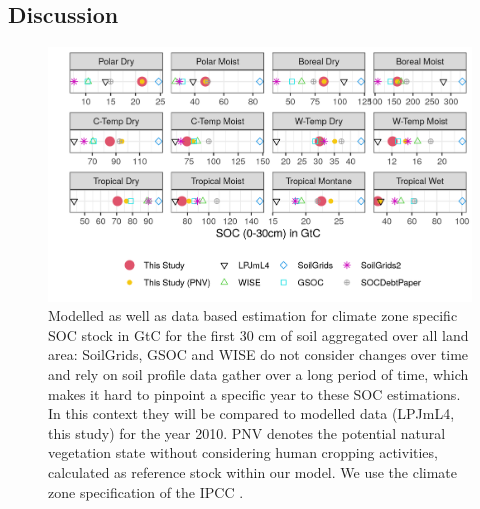 \documentclass[gc, manuscript]{copernicus}
\begin{document}
\subsection{Discussion}

\begin{figure}[H]
\includegraphics[width=16cm]{../ResultNotebooks/Output/Images/reg_comparisonfigure} 
\caption{Modelled as well as data based estimation for climate zone specific SOC stock in GtC for the first 30 cm of soil aggregated over all land area: SoilGrids, GSOC and WISE do not consider changes over time and rely on soil profile data gather over a long period of time, which makes it hard to pinpoint a specific year to these SOC estimations. In this context they will be compared to modelled data (LPJmL4, this study) for the year 2010. PNV denotes the potential natural vegetation state without considering human cropping activities, calculated as reference stock within our model. We use the climate zone specification of the IPCC \citep{eggleston_ipcc_2006}.}
\label{fig:SOCreg}
\end{figure}
\noappendix


\end{document}
